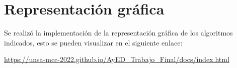 \documentclass{article}
\begin{document}
    \section{Representación gráfica}\label{sec:representacion}
        Se realizó la implementación de la representación gráfica de los algoritmos indicados, esto se pueden visualizar en el siguiente enlace:\par
	    \par
	    \begin{center}
	        \url{https://unsa-mcc-2022.github.io/AyED_Trabajo_Final/docs/index.html}
	    \end{center}
\end{document}
